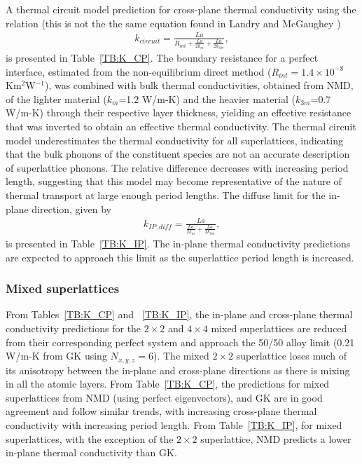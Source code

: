 \documentclass[aps,prb,preprint,preprintnumbers,amsmath,amssymb,floatfix,superscriptaddress]{revtex4}
\begin{document}
A thermal circuit model prediction for cross-plane thermal conductivity using the relation (this is not the the same equation found in Landry and McGaughey \cite{PhysRevB.77.184302})
\begin{equation}\label{EQ:TCircuit}
\begin{split}
k_{circuit}= \frac{La}{R_{int}+\frac{La}{2k_m}+\frac{La}{2k_{3m}}},
\end{split}
\end{equation}
is presented in Table~\ref{TB:K_CP}. The boundary resistance for a perfect interface, estimated from the non-equilibrium direct method ($R_{int}=1.4\times10^{-8}$ Km$^2$W$^{-1}$), was combined with bulk thermal conductivities, obtained from NMD, of the lighter material ($k_{m}$=1.2 W/m-K) and the heavier material ($k_{3m}$=0.7 W/m-K) through their respective layer thickness, yielding an effective resistance that was inverted to obtain an effective thermal conductivity. The thermal circuit model underestimates the thermal conductivity for all superlattices, indicating that the bulk phonons of the constituent species are not an accurate description of superlattice phonons. The relative difference decreases with increasing period length, suggesting that this model may become representative of the nature of thermal transport at large enough period lengths.
The diffuse limit for the in-plane direction, given by \cite{PhysRevB.77.184302}
\begin{equation}\label{EQ:TCircuit}
\begin{split}
k_{IP,diff}= \frac{La}{\frac{La}{2k_m}+\frac{La}{2k_{3m}}},
\end{split}
\end{equation}
is presented in Table~\ref{TB:K_IP}. The in-plane thermal conductivity predictions are expected to approach this limit as the superlattice period length is increased.
\subsubsection{Mixed superlattices}
From Tables~\ref{TB:K_CP} and ~\ref{TB:K_IP}, the in-plane and cross-plane thermal conductivity predictions for the $2\times 2$ and $4\times 4$ mixed superlattices are reduced from their corresponding perfect system and approach the 50/50 alloy limit (0.21 W/m-K from GK using $N_{x,y,z}=6$). The mixed $2\times 2$ superlattice loses much of its anisotropy between the in-plane and cross-plane directions as there is mixing in all the atomic layers. From Table~\ref{TB:K_CP}, the predictions for mixed superlattices from NMD (using perfect eigenvectors), and GK are in good agreement and follow similar trends, with increasing cross-plane thermal conductivity with increasing period length. From Table~\ref{TB:K_IP}, for mixed superlattices, with the exception of  the $2 \times 2$ superlattice, NMD predicts a lower in-plane thermal conductivity than GK.
\end{document}
